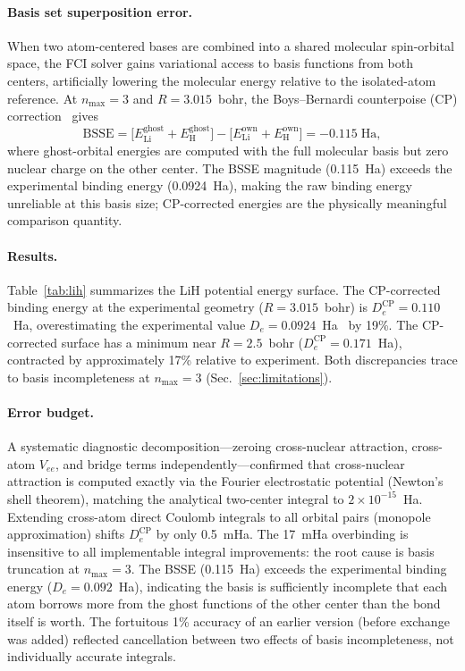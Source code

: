 \documentclass[aps,pra,twocolumn,superscriptaddress,longbibliography,floatfix]{revtex4-2}
\begin{document}
\paragraph{Basis set superposition error.}
When two atom-centered bases are combined into a shared molecular
spin-orbital space, the FCI solver gains variational access to basis
functions from both centers, artificially lowering the molecular energy
relative to the isolated-atom reference. At $n_{\max}=3$ and
$R = 3.015$~bohr, the Boys--Bernardi counterpoise (CP)
correction~\cite{Boys1970} gives
\begin{equation}
\text{BSSE} = \bigl[E_{\text{Li}}^{\text{ghost}}
+ E_{\text{H}}^{\text{ghost}}\bigr]
- \bigl[E_{\text{Li}}^{\text{own}}
+ E_{\text{H}}^{\text{own}}\bigr]
= -0.115\;\text{Ha},
\label{eq:bsse}
\end{equation}
where ghost-orbital energies are computed with the full molecular basis
but zero nuclear charge on the other center. The BSSE magnitude
(0.115~Ha) exceeds the experimental binding energy (0.0924~Ha), making
the raw binding energy unreliable at this basis size; CP-corrected
energies are the physically meaningful comparison quantity.

\paragraph{Results.}
Table~\ref{tab:lih} summarizes the LiH potential energy surface.
The CP-corrected binding energy at the experimental geometry
($R = 3.015$~bohr) is $D_e^{\text{CP}} = 0.110$~Ha, overestimating
the experimental value $D_e = 0.0924$~Ha~\cite{Huber1979} by 19\%.
The CP-corrected surface has a minimum near $R = 2.5$~bohr
($D_e^{\text{CP}} = 0.171$~Ha), contracted by approximately 17\%
relative to experiment. Both discrepancies trace to basis incompleteness at $n_{\max}=3$
(Sec.~\ref{sec:limitations}).

\paragraph{Error budget.}
A systematic diagnostic decomposition---zeroing cross-nuclear attraction,
cross-atom $V_{ee}$, and bridge terms independently---confirmed that
cross-nuclear attraction is computed exactly via the Fourier electrostatic
potential (Newton's shell theorem), matching the analytical two-center
integral to $2 \times 10^{-15}$~Ha. Extending cross-atom direct Coulomb
integrals to all orbital pairs (monopole approximation) shifts
$D_e^{\text{CP}}$ by only 0.5~mHa. The 17~mHa overbinding is insensitive
to all implementable integral improvements: the root cause is basis
truncation at $n_{\max}=3$. The BSSE (0.115~Ha) exceeds the experimental
binding energy ($D_e = 0.092$~Ha), indicating the basis is sufficiently
incomplete that each atom borrows more from the ghost functions of the
other center than the bond itself is worth. The fortuitous 1\% accuracy
of an earlier version (before exchange was added) reflected cancellation
between two effects of basis incompleteness, not individually accurate
integrals.
\end{document}

